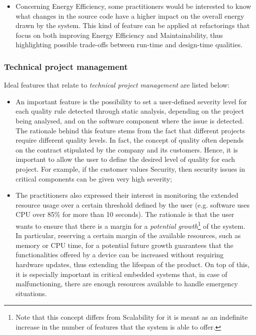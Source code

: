 \begin{itemize}
    \item Concerning Energy Efficiency, some practitioners would be interested to know what changes in the source code have a higher impact on the overall energy drawn by the system.
    This kind of feature can be applied at refactorings that focus on both improving Energy Efficiency and Maintainability, thus highlighting possible trade-offs between run-time and design-time qualities.   
\end{itemize}

\subsubsection{Technical project management}
Ideal features that relate to \textit{technical project management} are listed below:
\begin{itemize}
    \item An important feature is the possibility to set a user-defined severity level for each quality rule detected through static analysis, depending on the project being analysed, and on the software component where the issue is detected.
    The rationale behind this feature stems from the fact that different projects require different quality levels.
    In fact, the concept of quality often depends on the contract stipulated by the company and its customers.
    Hence, it is important to allow the user to define the desired level of quality for each project. For example, if the customer values Security, then security issues in critical components can be given very high severity;

    \item The practitioners also expressed their interest in monitoring the extended resource usage over a certain threshold defined by the user (e.g. software uses CPU over 85\% for more than 10 seconds).
    The rationale is that the user wants to ensure that there is a margin for a \textit{potential growth}\footnote{Note that this concept differs from Scalability for it is meant as an indefinite increase in the number of features that the system is able to offer.} of the system.
    In particular, reserving a certain margin of the available resources, such as memory or CPU time, for a potential future growth guarantees that the functionalities offered by a device can be increased without requiring hardware updates, thus extending the lifespan of the product.
    On top of this, it is especially important in critical embedded systems that, in case of malfunctioning, there are enough resources available to handle emergency situations.
    

\end{itemize}
